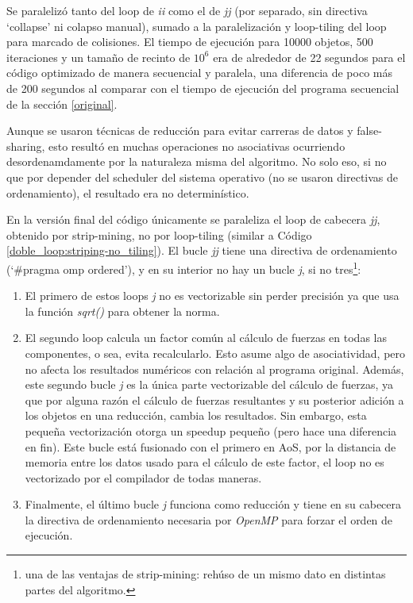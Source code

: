 \documentclass{article}
\begin{document}
Se paralelizó tanto del loop de \textit{ii} como el de \textit{jj} (por separado, sin directiva `collapse' ni colapso manual),
sumado a la paralelización y loop-tiling del loop para marcado de colisiones. El tiempo de ejecución para 10000 objetos, 500 iteraciones y un
tamaño de recinto de $10^6$ era de alrededor de 22 segundos para el código optimizado de manera secuencial y paralela,
una diferencia de poco más de 200 segundos al comparar con el tiempo de ejecución del programa secuencial de la sección \ref{original}.

Aunque se usaron técnicas de reducción para evitar carreras de datos y false-sharing, esto resultó en muchas operaciones
no asociativas ocurriendo desordenamdamente por la naturaleza misma del algoritmo. No solo eso, si no que
por depender del scheduler del sistema operativo (no se usaron directivas de ordenamiento), el resultado era no determinístico.

En la versión final del código únicamente se paraleliza el loop de cabecera \textit{jj}, obtenido
por strip-mining, no por loop-tiling (similar a Código \ref{doble_loop:striping-no_tiling}).
El bucle \textit{jj} tiene una directiva de ordenamiento (`\#pragma omp ordered'), y en su interior
no hay un bucle \textit{j}, si no tres\footnote{una de las ventajas de strip-mining: rehúso de un mismo dato en distintas partes
del algoritmo.}:

\begin{enumerate}
	\item El primero de estos loops \textit{j} no es vectorizable sin perder precisión ya que usa la función \textit{sqrt()} para
obtener la norma.

	\item El segundo loop calcula un factor común al cálculo de fuerzas en todas las componentes, o sea, evita
recalcularlo. Esto asume algo de asociatividad, pero no afecta los resultados numéricos con relación al programa original.
Además, este segundo bucle \textit{j} es la única parte vectorizable del cálculo de fuerzas, ya que por alguna razón el
cálculo de fuerzas resultantes y su posterior adición a los objetos en una reducción, cambia los resultados. Sin embargo,
esta pequeña vectorización otorga un speedup pequeño (pero hace una diferencia en fin). Este bucle está fusionado
con el primero en AoS, por la distancia de memoria entre los datos usado para el cálculo de este factor, el loop
no es vectorizado por el compilador de todas maneras.

	\item Finalmente, el último bucle \textit{j} funciona como reducción y tiene en su cabecera la directiva de ordenamiento
necesaria por \textit{OpenMP} para forzar el orden de ejecución.
\end{enumerate}
\end{document}
